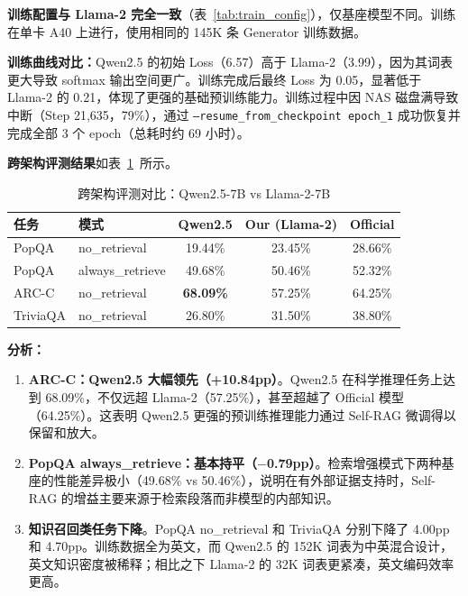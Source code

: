 \documentclass[11pt,a4paper]{article}
\begin{document}
\textbf{训练配置与 Llama-2 完全一致}（表~\ref{tab:train_config}），仅基座模型不同。训练在单卡 A40 上进行，使用相同的 145K 条 Generator 训练数据。

\textbf{训练曲线对比：}Qwen2.5 的初始 Loss（6.57）高于 Llama-2（3.99），因为其词表更大导致 softmax 输出空间更广。训练完成后最终 Loss 为 0.05，显著低于 Llama-2 的 0.21，体现了更强的基础预训练能力。训练过程中因 NAS 磁盘满导致中断（Step 21,635，79\%），通过 \texttt{--resume\_from\_checkpoint epoch\_1} 成功恢复并完成全部 3 个 epoch（总耗时约 69 小时）。

\textbf{跨架构评测结果}如表~\ref{tab:cross_arch}~所示。

\begin{table}[H]
\centering
\caption{跨架构评测对比：Qwen2.5-7B vs Llama-2-7B}
\label{tab:cross_arch}
\begin{tabular}{llccc}
\toprule
任务 & 模式 & Qwen2.5 & Our (Llama-2) & Official \\
\midrule
PopQA & no\_retrieval & 19.44\% & 23.45\% & 28.66\% \\
PopQA & always\_retrieve & 49.68\% & 50.46\% & 52.32\% \\
ARC-C & no\_retrieval & \textbf{68.09\%} & 57.25\% & 64.25\% \\
TriviaQA & no\_retrieval & 26.80\% & 31.50\% & 38.80\% \\
\bottomrule
\end{tabular}
\end{table}

\textbf{分析：}

\begin{enumerate}[leftmargin=2em]
    \item \textbf{ARC-C：Qwen2.5 大幅领先（+10.84pp）}。Qwen2.5 在科学推理任务上达到 68.09\%，不仅远超 Llama-2（57.25\%），甚至超越了 Official 模型（64.25\%）。这表明 Qwen2.5 更强的预训练推理能力通过 Self-RAG 微调得以保留和放大。

    \item \textbf{PopQA always\_retrieve：基本持平（$-$0.79pp）}。检索增强模式下两种基座的性能差异极小（49.68\% vs 50.46\%），说明在有外部证据支持时，Self-RAG 的增益主要来源于检索段落而非模型的内部知识。

    \item \textbf{知识召回类任务下降}。PopQA no\_retrieval 和 TriviaQA 分别下降了 4.00pp 和 4.70pp。训练数据全为英文，而 Qwen2.5 的 152K 词表为中英混合设计，英文知识密度被稀释；相比之下 Llama-2 的 32K 词表更紧凑，英文编码效率更高。
\end{enumerate}
\end{document}
